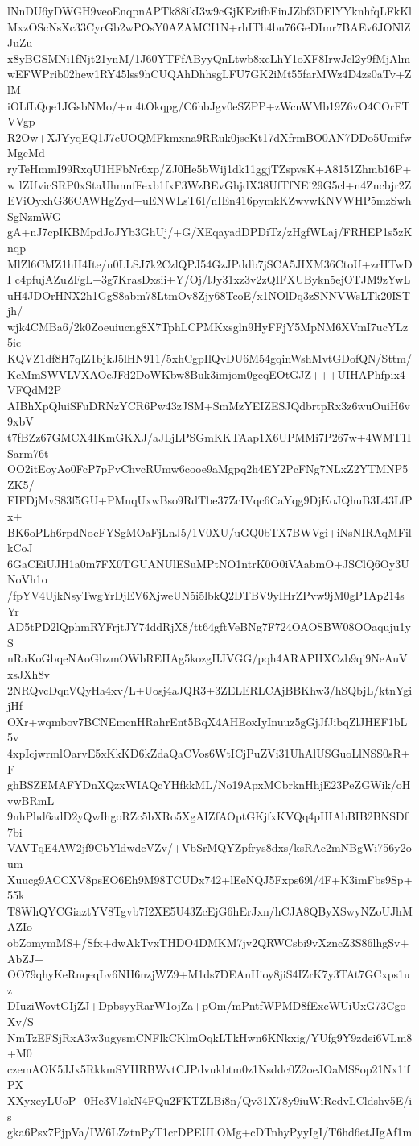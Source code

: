 lNnDU6yDWGH9veoEnqpnAPTk88ikI3w9cGjKEzifbEinJZbf3DElYYknhfqLFkKl
MxzOScNsXc33CyrGb2wPOsY0AZAMCI1N+rhITh4bn76GeDImr7BAEv6JONlZJuZu
x8yBGSMNi1fNjt21ynM/1J60YTFfAByyQnLtwb8xeLhY1oXF8IrwJcl2y9fMjAlm
wEFWPrib02hew1RY45lss9hCUQAhDhhsgLFU7GK2iMt55farMWz4D4zs0aTv+ZlM
iOLfLQqe1JGsbNMo/+m4tOkqpg/C6hbJgv0eSZPP+zWcnWMb19Z6vO4COrFTVVgp
R2Ow+XJYyqEQ1J7cUOQMFkmxna9RRuk0jseKt17dXfrmBO0AN7DDo5UmifwMgcMd
ryTeHmmI99RxqU1HFbNr6xp/ZJ0He5bWij1dk11ggjTZspvsK+A8151Zhmb16P+w
lZUvicSRP0xStaUhmnfFexb1fxF3WzBEvGhjdX38UfTfNEi29G5cl+n4Zncbjr2Z
EViOyxhG36CAWHgZyd+uENWLsT6I/nIEn416pymkKZwvwKNVWHP5mzSwhSgNzmWG
gA+nJ7cpIKBMpdJoJYb3GhUj/+G/XEqayadDPDiTz/zHgfWLaj/FRHEP1s5zKnqp
MlZl6CMZ1hH4Ite/n0LLSJ7k2CzlQPJ54GzJPddb7jSCA5JIXM36CtoU+zrHTwDI
c4pfujAZuZFgL+3g7KrasDxsii+Y/Oj/lJy31xz3v2zQIFXUBykn5ejOTJM9zYwL
uH4JDOrHNX2h1GgS8abm78LtmOv8Zjy68TcoE/x1NOlDq3zSNNVWsLTk20ISTjh/
wjk4CMBa6/2k0Zoeuiucng8X7TphLCPMKxsgln9HyFFjY5MpNM6XVmI7ucYLz5ic
KQVZ1df8H7qlZ1bjkJ5lHN911/5xhCgpIlQvDU6M54gqinWshMvtGDofQN/Sttm/
KcMmSWVLVXAOeJFd2DoWKbw8Buk3imjom0gcqEOtGJZ+++UIHAPhfpix4VFQdM2P
AIBhXpQluiSFuDRNzYCR6Pw43zJSM+SmMzYEIZESJQdbrtpRx3z6wuOuiH6v9xbV
t7fBZz67GMCX4IKmGKXJ/aJLjLPSGmKKTAap1X6UPMMi7P267w+4WMT1ISarm76t
OO2itEoyAo0FcP7pPvChvcRUmw6cooe9aMgpq2h4EY2PcFNg7NLxZ2YTMNP5ZK5/
FIFDjMvS83f5GU+PMnqUxwBso9RdTbe37ZcIVqc6CaYqg9DjKoJQhuB3L43LfPx+
BK6oPLh6rpdNocFYSgMOaFjLnJ5/1V0XU/uGQ0bTX7BWVgi+iNsNIRAqMFilkCoJ
6GaCEiUJH1a0m7FX0TGUANUlESuMPtNO1ntrK0O0iVAabmO+JSClQ6Oy3UNoVh1o
/fpYV4UjkNsyTwgYrDjEV6XjweUN5i5lbkQ2DTBV9yIHrZPvw9jM0gP1Ap214sYr
AD5tPD2lQphmRYFrjtJY74ddRjX8/tt64gftVeBNg7F724OAOSBW08OOaquju1yS
nRaKoGbqeNAoGhzmOWbREHAg5kozgHJVGG/pqh4ARAPHXCzb9qi9NeAuVxsJXh8v
2NRQvcDqnVQyHa4xv/L+Uosj4aJQR3+3ZELERLCAjBBKhw3/hSQbjL/ktnYgijHf
OXr+wqmbov7BCNEmcnHRahrEnt5BqX4AHEoxIyInuuz5gGjJfJibqZlJHEF1bL5v
4xpIcjwrmlOarvE5xKkKD6kZdaQaCVos6WtICjPuZVi31UhAlUSGuoLlNSS0sR+F
ghBSZEMAFYDnXQzxWIAQcYHfkkML/No19ApxMCbrknHhjE23PeZGWik/oHvwBRmL
9nhPhd6adD2yQwIhgoRZc5bXRo5XgAIZfAOptGKjfxKVQq4pHIAbBIB2BNSDf7bi
VAVTqE4AW2jf9CbYldwdcVZv/+VbSrMQYZpfrys8dxs/ksRAc2mNBgWi756y2oum
Xuucg9ACCXV8psEO6Eh9M98TCUDx742+lEeNQJ5Fxps69l/4F+K3imFbs9Sp+55k
T8WhQYCGiaztYV8Tgvb7I2XE5U43ZcEjG6hErJxn/hCJA8QByXSwyNZoUJhMAZIo
obZomymMS+/Sfx+dwAkTvxTHDO4DMKM7jv2QRWCsbi9vXzncZ3S86lhgSv+AbZJ+
OO79qhyKeRnqeqLv6NH6nzjWZ9+M1ds7DEAnHioy8jiS4IZrK7y3TAt7GCxps1uz
DIuziWovtGIjZJ+DpbsyyRarW1ojZa+pOm/mPntfWPMD8fExcWUiUxG73CgoXv/S
NmTzEFSjRxA3w3ugysmCNFlkCKlmOqkLTkHwn6KNkxig/YUfg9Y9zdei6VLm8+M0
czemAOK5JJx5RkkmSYHRBWvtCJPdvukbtm0z1Nsddc0Z2oeJOaMS8op21Nx1ifPX
XXyxeyLUoP+0He3V1skN4FQu2FKTZLBi8n/Qv31X78y9iuWiRedvLCldshv5E/is
gka6Psx7PjpVa/IW6LZztnPyT1crDPEULOMg+cDTnhyPyyIgI/T6hd6etJIgAf1m
